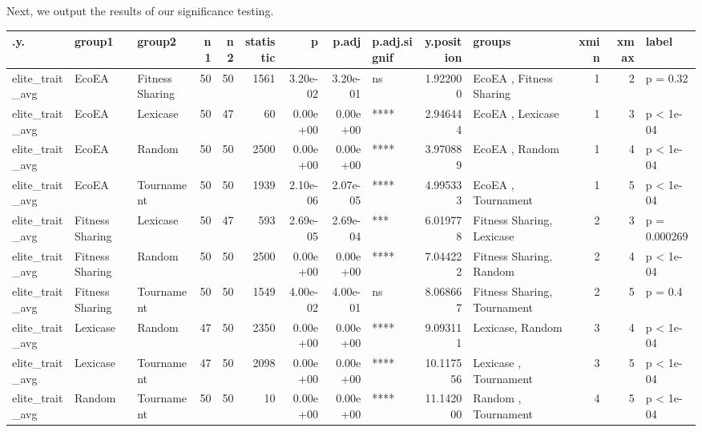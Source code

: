 \documentclass[]{book}
\newenvironment{Shaded}{\begin{snugshade}}{\end{snugshade}}
\newcommand{\DataTypeTok}[1]{\textcolor[rgb]{0.13,0.29,0.53}{#1}}
\newcommand{\KeywordTok}[1]{\textcolor[rgb]{0.13,0.29,0.53}{\textbf{#1}}}
\newcommand{\NormalTok}[1]{#1}
\newcommand{\OperatorTok}[1]{\textcolor[rgb]{0.81,0.36,0.00}{\textbf{#1}}}
\newcommand{\StringTok}[1]{\textcolor[rgb]{0.31,0.60,0.02}{#1}}
\begin{document}
Next, we output the results of our significance testing.

\begin{Shaded}
\end{Shaded}

\begin{table}
\centering
\begin{tabular}[t]{l|l|l|r|r|r|r|r|l|r|l|r|r|l}
\hline
.y. & group1 & group2 & n1 & n2 & statistic & p & p.adj & p.adj.signif & y.position & groups & xmin & xmax & label\\
\hline
elite\_trait\_avg & EcoEA & Fitness Sharing & 50 & 50 & 1561 & 3.20e-02 & 3.20e-01 & ns & 1.922000 & EcoEA          , Fitness Sharing & 1 & 2 & p = 0.32\\
\hline
elite\_trait\_avg & EcoEA & Lexicase & 50 & 47 & 60 & 0.00e+00 & 0.00e+00 & **** & 2.946444 & EcoEA   , Lexicase & 1 & 3 & p < 1e-04\\
\hline
elite\_trait\_avg & EcoEA & Random & 50 & 50 & 2500 & 0.00e+00 & 0.00e+00 & **** & 3.970889 & EcoEA , Random & 1 & 4 & p < 1e-04\\
\hline
elite\_trait\_avg & EcoEA & Tournament & 50 & 50 & 1939 & 2.10e-06 & 2.07e-05 & **** & 4.995333 & EcoEA     , Tournament & 1 & 5 & p < 1e-04\\
\hline
elite\_trait\_avg & Fitness Sharing & Lexicase & 50 & 47 & 593 & 2.69e-05 & 2.69e-04 & *** & 6.019778 & Fitness Sharing, Lexicase & 2 & 3 & p = 0.000269\\
\hline
elite\_trait\_avg & Fitness Sharing & Random & 50 & 50 & 2500 & 0.00e+00 & 0.00e+00 & **** & 7.044222 & Fitness Sharing, Random & 2 & 4 & p < 1e-04\\
\hline
elite\_trait\_avg & Fitness Sharing & Tournament & 50 & 50 & 1549 & 4.00e-02 & 4.00e-01 & ns & 8.068667 & Fitness Sharing, Tournament & 2 & 5 & p = 0.4\\
\hline
elite\_trait\_avg & Lexicase & Random & 47 & 50 & 2350 & 0.00e+00 & 0.00e+00 & **** & 9.093111 & Lexicase, Random & 3 & 4 & p < 1e-04\\
\hline
elite\_trait\_avg & Lexicase & Tournament & 47 & 50 & 2098 & 0.00e+00 & 0.00e+00 & **** & 10.117556 & Lexicase  , Tournament & 3 & 5 & p < 1e-04\\
\hline
elite\_trait\_avg & Random & Tournament & 50 & 50 & 10 & 0.00e+00 & 0.00e+00 & **** & 11.142000 & Random    , Tournament & 4 & 5 & p < 1e-04\\
\hline
\end{tabular}
\end{table}
\end{document}

